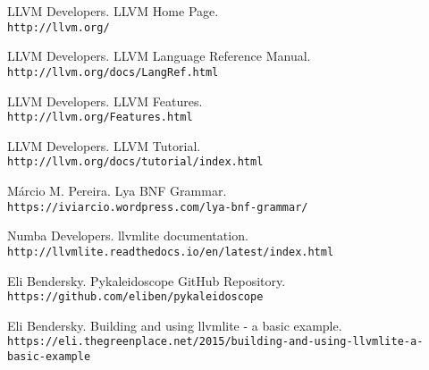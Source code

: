 \documentclass[11pt, oneside, titlepage]{report}
\begin{document}
    
    \begin{thebibliography}{9}

      LLVM Developers. LLVM Home Page.\\
      \texttt{http://llvm.org/}

      LLVM Developers. LLVM Language Reference Manual.\\
      \texttt{http://llvm.org/docs/LangRef.html}

      LLVM Developers. LLVM Features.\\
      \texttt{http://llvm.org/Features.html}

      LLVM Developers. LLVM Tutorial.\\
      \texttt{http://llvm.org/docs/tutorial/index.html}

      Márcio M. Pereira. Lya BNF Grammar.\\
      \texttt{https://iviarcio.wordpress.com/lya-bnf-grammar/}

      Numba Developers. llvmlite documentation.\\
      \texttt{http://llvmlite.readthedocs.io/en/latest/index.html}

      Eli Bendersky. Pykaleidoscope GitHub Repository.\\
      \texttt{https://github.com/eliben/pykaleidoscope}

      Eli Bendersky. Building and using llvmlite - a basic example.\\
      \texttt{https://eli.thegreenplace.net/2015/building-and-using-llvmlite-a-basic-example}

    \end{thebibliography}

  
\end{document}
